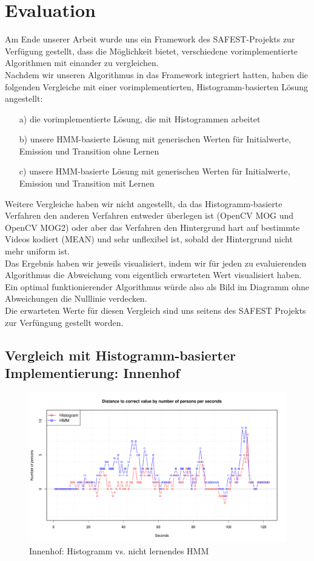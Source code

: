 \section{Evaluation}
\label{chap:evaluation}
Am Ende unserer Arbeit wurde uns ein Framework des SAFEST-Projekts zur Verfügung gestellt, dass die Möglichkeit bietet, verschiedene vorimplementierte Algorithmen mit einander zu vergleichen.\\
Nachdem wir unseren Algorithmus in das Framework integriert hatten, haben die folgenden Vergleiche mit einer vorimplementierten, Histogramm-basierten Lösung angestellt:
\begin{itemize}
	\item[a)] die vorimplementierte Lösung, die mit Histogrammen arbeitet
	\item[b)] unsere HMM-basierte Lösung mit generischen Werten für Initialwerte, Emission und Transition ohne Lernen
	\item[c)] unsere HMM-basierte Lösung mit generischen Werten für Initialwerte, Emission und Transition mit Lernen
\end{itemize}
Weitere Vergleiche haben wir nicht angestellt, da das Histogramm-basierte Verfahren den anderen Verfahren entweder überlegen ist (OpenCV MOG und OpenCV MOG2) oder aber das Verfahren den Hintergrund hart auf bestimmte Videos kodiert (MEAN) und sehr unflexibel ist, sobald der Hintergrund nicht mehr uniform ist.\\
Das Ergebnis haben wir jeweils visualisiert, indem wir für jeden zu evaluierenden Algorithmus die Abweichung vom eigentlich erwarteten Wert visualisiert haben.
Ein optimal funktionierender Algorithmus würde also als Bild im Diagramm ohne Abweichungen die Nulllinie verdecken.\\
Die erwarteten Werte für diesen Vergleich sind uns seitens des SAFEST Projekts zur Verfüngung gestellt worden.
\subsection{Vergleich mit Histogramm-basierter Implementierung: Innenhof}
\label{sec:eval_innenhof}
\begin{figure}
	\centering
\includegraphics[width=1\textwidth]{bilder/safest_plot_tegel_7-55.pdf}
\caption{Innenhof: Histogramm vs. nicht lernendes HMM}
	\label{fig:Innenhof_nl}
\end{figure}

